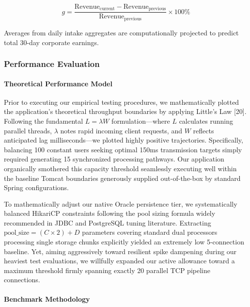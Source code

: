 \begin{equation}
g = \frac{\text{Revenue}_{\text{current}} - \text{Revenue}_{\text{previous}}}{\text{Revenue}_{\text{previous}}} \times 100\%
\end{equation}

Averages from daily intake aggregates are computationally projected to
predict total 30-day corporate earnings.

\subsubsection*{Performance Evaluation}\label{performance-evaluation}

\paragraph*{Theoretical Performance
Model}\label{theoretical-performance-model}

Prior to executing our empirical testing procedures, we mathematically
plotted the application's theoretical throughput boundaries by applying
Little's Law {[}20{]}. Following the fundamental \(L = \lambda W\)
formulation---where \(L\) calculates running parallel threads,
\(\lambda\) notes rapid incoming client requests, and \(W\) reflects
anticipated lag milliseconds---we plotted highly positive trajectories.
Specifically, balancing 100 constant users seeking optimal 150ms
transmission targets simply required generating 15 synchronized
processing pathways. Our application organically smothered this capacity
threshold seamlessly executing well within the baseline Tomcat
boundaries generously supplied out-of-the-box by standard Spring
configurations.

To mathematically adjust our native Oracle persistence tier, we
systematically balanced HikariCP constraints following the pool sizing
formula widely recommended in JDBC and PostgreSQL tuning literature.
Extracting \(\text{pool\_size} = (C \times 2) + D\) parameters covering
standard dual processors processing single storage chunks explicitly
yielded an extremely low 5-connection baseline. Yet, aiming aggressively
toward resilient spike dampening during our heaviest test evaluations,
we willfully expanded our active allowance toward a maximum threshold
firmly spanning exactly 20 parallel TCP pipeline connections.

\paragraph*{Benchmark Methodology}\label{benchmark-methodology}

